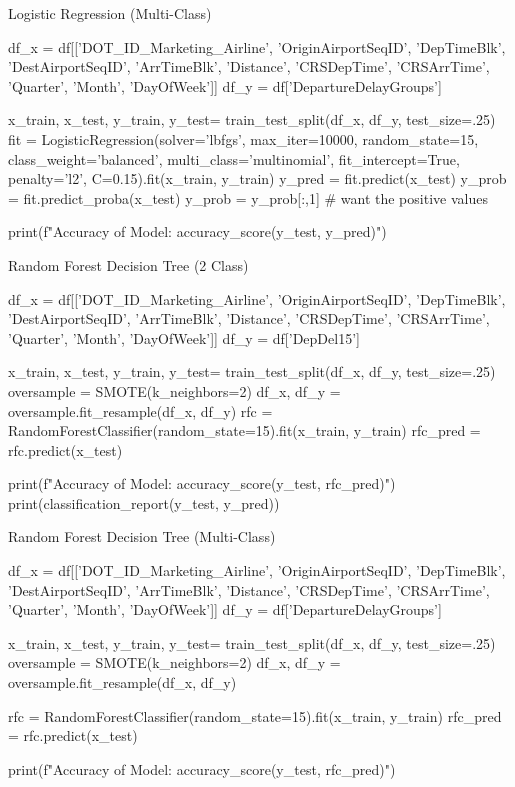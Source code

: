 \documentclass[a4paper,12pt]{article}
\begin{document}
Logistic Regression (Multi-Class)

\begin{python}
df_x = df[['DOT_ID_Marketing_Airline', 'OriginAirportSeqID', 'DepTimeBlk', 'DestAirportSeqID', 'ArrTimeBlk', 'Distance', 'CRSDepTime',
 'CRSArrTime', 'Quarter', 'Month', 'DayOfWeek']]
df_y = df['DepartureDelayGroups']

x_train, x_test, y_train, y_test= train_test_split(df_x, df_y, test_size=.25)
fit = LogisticRegression(solver='lbfgs', max_iter=10000, random_state=15, class_weight='balanced', multi_class='multinomial', fit_intercept=True, penalty='l2', C=0.15).fit(x_train, y_train)
y_pred = fit.predict(x_test)
y_prob = fit.predict_proba(x_test)
y_prob = y_prob[:,1] # want the positive values

print(f"Accuracy of Model: {accuracy_score(y_test, y_pred)}")
\end{python}

Random Forest Decision Tree (2 Class)

\begin{python}
df_x = df[['DOT_ID_Marketing_Airline', 'OriginAirportSeqID', 'DepTimeBlk', 'DestAirportSeqID', 'ArrTimeBlk', 'Distance', 'CRSDepTime',
 'CRSArrTime', 'Quarter', 'Month', 'DayOfWeek']]
df_y = df['DepDel15']

x_train, x_test, y_train, y_test= train_test_split(df_x, df_y, test_size=.25)
oversample = SMOTE(k_neighbors=2)
df_x, df_y = oversample.fit_resample(df_x, df_y)
rfc = RandomForestClassifier(random_state=15).fit(x_train, y_train)
rfc_pred = rfc.predict(x_test)

print(f"Accuracy of Model: {accuracy_score(y_test, rfc_pred)}")
print(classification_report(y_test, y_pred))
\end{python}

Random Forest Decision Tree (Multi-Class)

\begin{python}
df_x = df[['DOT_ID_Marketing_Airline', 'OriginAirportSeqID', 'DepTimeBlk', 'DestAirportSeqID', 'ArrTimeBlk', 'Distance', 'CRSDepTime',
 'CRSArrTime', 'Quarter', 'Month', 'DayOfWeek']]
df_y = df['DepartureDelayGroups']

x_train, x_test, y_train, y_test= train_test_split(df_x, df_y, test_size=.25)
oversample = SMOTE(k_neighbors=2)
df_x, df_y = oversample.fit_resample(df_x, df_y)

rfc = RandomForestClassifier(random_state=15).fit(x_train, y_train)
rfc_pred = rfc.predict(x_test)

print(f"Accuracy of Model: {accuracy_score(y_test, rfc_pred)}")
\end{python}
\end{document}
